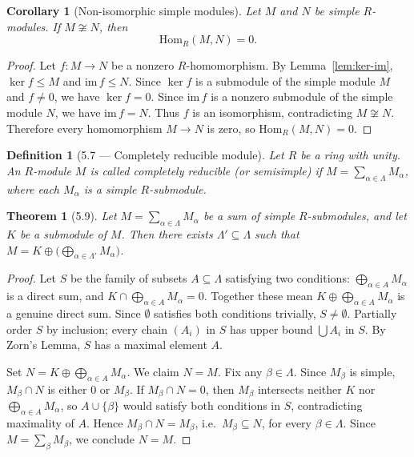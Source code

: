 \documentclass[12pt]{article}
\newtheorem{theorem}{Theorem}
\newtheorem{corollary}{Corollary}
\newtheorem{definition}{Definition}
\begin{document}
\begin{corollary}[Non-isomorphic simple modules]
Let $M$ and $N$ be simple $R$-modules. If $M \not\cong N$, then
\[
  \mathrm{Hom}_R(M,N)=0.
\]
\end{corollary}

\begin{proof}
Let $f : M \to N$ be a nonzero $R$-homomorphism. By Lemma~\ref{lem:ker-im}, $\ker f \leq M$ and $\mathrm{im}\,f \leq N$. Since $\ker f$ is a submodule of the simple module $M$ and $f \neq 0$, we have $\ker f=0$. Since $\mathrm{im}\,f$ is a nonzero submodule of the simple module $N$, we have $\mathrm{im}\,f=N$. Thus $f$ is an isomorphism, contradicting $M \not\cong N$. Therefore every homomorphism $M \to N$ is zero, so $\mathrm{Hom}_R(M,N)=0$.
\end{proof}

\begin{definition}[5.7 — Completely reducible module]
Let $R$ be a ring with unity. An $R$-module $M$ is called \emph{completely reducible} (or \emph{semisimple}) if $M = \sum_{\alpha \in \Lambda} M_\alpha$, where each $M_\alpha$ is a simple $R$-submodule.
\end{definition}

\begin{theorem}[5.9]
Let $M = \sum_{\alpha \in \Lambda} M_\alpha$ be a sum of simple $R$-submodules, and let $K$ be a submodule of $M$. Then there exists $\Lambda' \subseteq \Lambda$ such that $M = K \oplus \bigl(\bigoplus_{\alpha \in \Lambda'} M_\alpha\bigr)$.
\end{theorem}

\begin{proof}
Let $S$ be the family of subsets $A \subseteq \Lambda$ satisfying two conditions: $\bigoplus_{\alpha \in A} M_\alpha$ is a direct sum, and $K \cap \bigoplus_{\alpha \in A} M_\alpha = 0$. Together these mean $K \oplus \bigoplus_{\alpha \in A} M_\alpha$ is a genuine direct sum. Since $\emptyset$ satisfies both conditions trivially, $S \neq \emptyset$. Partially order $S$ by inclusion; every chain $(A_i)$ in $S$ has upper bound $\bigcup A_i$ in $S$. By Zorn's Lemma, $S$ has a maximal element $A$.

Set $N = K \oplus \bigoplus_{\alpha \in A} M_\alpha$. We claim $N = M$. Fix any $\beta \in \Lambda$. Since $M_\beta$ is simple, $M_\beta \cap N$ is either $0$ or $M_\beta$. If $M_\beta \cap N = 0$, then $M_\beta$ intersects neither $K$ nor $\bigoplus_{\alpha \in A} M_\alpha$, so $A \cup \{\beta\}$ would satisfy both conditions in $S$, contradicting maximality of $A$. Hence $M_\beta \cap N = M_\beta$, i.e.\ $M_\beta \subseteq N$, for every $\beta \in \Lambda$. Since $M = \sum_\beta M_\beta$, we conclude $N = M$.
\end{proof}
\end{document}

